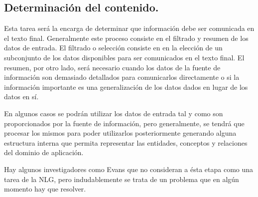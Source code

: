 \begin{comment}
\begin{table}[h]
\centering
\begin{tabular}{lll}
\toprule \textsc{Modulo} & \textsc{Tareas de contenido} & \textsc{Tareas estructurales}\\
    
\midrule \emph{Document planning} & Determinación de contenido & Estructuración del documento\\
\emph{Miroplanning} & Lexicalización & Agregación\\
 & Generación de expresiones de referencia & \\
\emph{Realization} & Realización lingüística & Realización de estructura\\
\bottomrule
\end{tabular}
\end{table}

A continuación se describirá el procesamiento realizado por cada una de estas tareas.

\end{comment}

\subsection{Determinación del contenido.}
Esta tarea será la encarga de determinar que información debe ser comunicada en el texto final. 
Generalmente este proceso consiste en el filtrado y resumen de los datos de entrada. 
El filtrado o selección consiste en en la elección de un subconjunto de los datos disponibles para ser comunicados en el texto final.
El resumen, por otro lado, será necesario cuando los datos de la fuente de información son demasiado detallados para comunicarlos directamente o si la información importante es una generalización de los datos dados en lugar de los datos en sí.

En algunos casos se podrán utilizar los datos de entrada tal y como son proporcionados por la fuente de información, pero generalmente, se tendrá que procesar los mismos para poder utilizarlos posteriormente generando alguna estructura interna que permita representar las entidades, conceptos y relaciones del dominio de aplicación.

Hay algunos investigadores como Evans\cite{completar} que no consideran a ésta etapa como una tarea de la NLG, pero indudablemente se trata de un problema que en algún momento hay que resolver.




